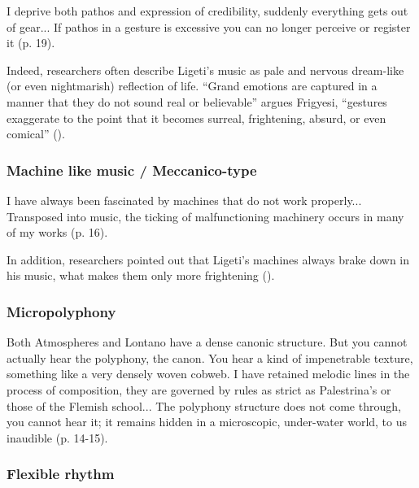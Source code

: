 \documentclass[a4paper,11pt]{article}
\newenvironment{MyShadequote}[1][]
    {\begin{mdframed}[style=MyShadeQuoteStyle,#1]}
    {\end{mdframed}}
\begin{document}
\begin{MyShadequote}
  I deprive both pathos and expression of credibility, suddenly everything gets out of gear...
  If pathos in a gesture is excessive you can no longer perceive or register it (p. 19).
\end{MyShadequote}

Indeed, researchers often describe Ligeti's music as pale and nervous dream-like (or even nightmarish) reflection of life.
``Grand emotions are captured in a manner that they do not sound real or believable'' argues Frigyesi, ``gestures exaggerate to the point that it becomes surreal, frightening, absurd, or even comical'' (\cite*{frigyesi}).

\subsubsection{Machine like music / Meccanico-type}
\label{subs:ligeti:machine}

\begin{MyShadequote}
  I have always been fascinated by machines that do not work properly...
  Transposed into music, the ticking of malfunctioning machinery occurs in many of my works (p. 16).
\end{MyShadequote}

In addition, researchers pointed out that Ligeti's machines always brake down in his music, what makes them only more frightening (\cite{frigyesi}).

\subsubsection{Micropolyphony}
\label{subs:ligeti:micropolyphony}

\begin{MyShadequote}
  Both Atmospheres and Lontano have a dense canonic structure.
  But you cannot actually hear the polyphony, the canon.
  You hear a kind of impenetrable texture, something like a very densely woven cobweb.
  I have retained melodic lines in the process of composition, they are governed by rules as strict as Palestrina’s or those of the Flemish school...
  The polyphony structure does not come through, you cannot hear it; it remains hidden in a microscopic, under-water world, to us inaudible (p. 14-15).
\end{MyShadequote}

\subsubsection{Flexible rhythm}
\label{subs:ligeti:flexible}
\end{document}
